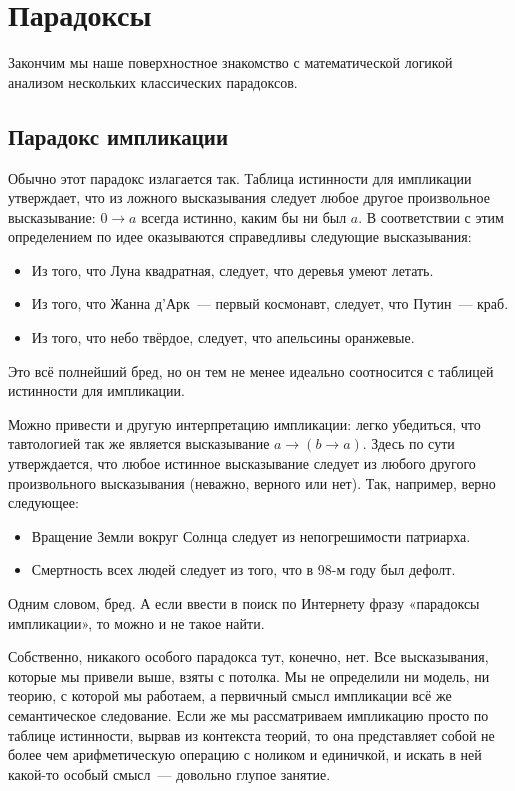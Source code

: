 \section{Парадоксы}

Закончим мы наше поверхностное знакомство с математической логикой анализом нескольких классических парадоксов.

\subsection{Парадокс импликации}

Обычно этот парадокс излагается так. Таблица истинности для импликации утверждает, что из ложного высказывания следует любое другое произвольное высказывание: $0 \rightarrow a$ всегда истинно, каким бы ни был $a$. В соответствии с этим определением по идее оказываются справедливы следующие высказывания:

\begin{itemize}
\item Из того, что Луна квадратная, следует, что деревья умеют летать.
\item Из того, что Жанна д’Арк~--- первый космонавт, следует, что Путин~--- краб.
\item Из того, что небо твёрдое, следует, что апельсины оранжевые.
\end{itemize}

Это всё полнейший бред, но он тем не менее идеально соотносится с таблицей истинности для импликации.

Можно привести и другую интерпретацию импликации: легко убедиться, что тавтологией так же является высказывание $a \rightarrow (b \rightarrow a)$. Здесь по сути утверждается, что любое истинное высказывание следует из любого другого произвольного высказывания (неважно, верного или нет). Так, например, верно следующее:

\begin{itemize}
\item Вращение Земли вокруг Солнца следует из непогрешимости патриарха.
\item Смертность всех людей следует из того, что в 98-м году был дефолт.
\end{itemize}

Одним словом, бред. А если ввести в поиск по Интернету фразу «парадоксы импликации», то можно и не такое найти.

Собственно, никакого особого парадокса тут, конечно, нет. Все высказывания, которые мы привели выше, взяты с потолка. Мы не определили ни модель, ни теорию, с которой мы работаем, а первичный смысл импликации всё же семантическое следование. Если же мы рассматриваем импликацию просто по таблице истинности, вырвав из контекста теорий, то она представляет собой не более чем арифметическую операцию с ноликом и единичкой, и искать в ней какой-то особый смысл~--- довольно глупое занятие.

